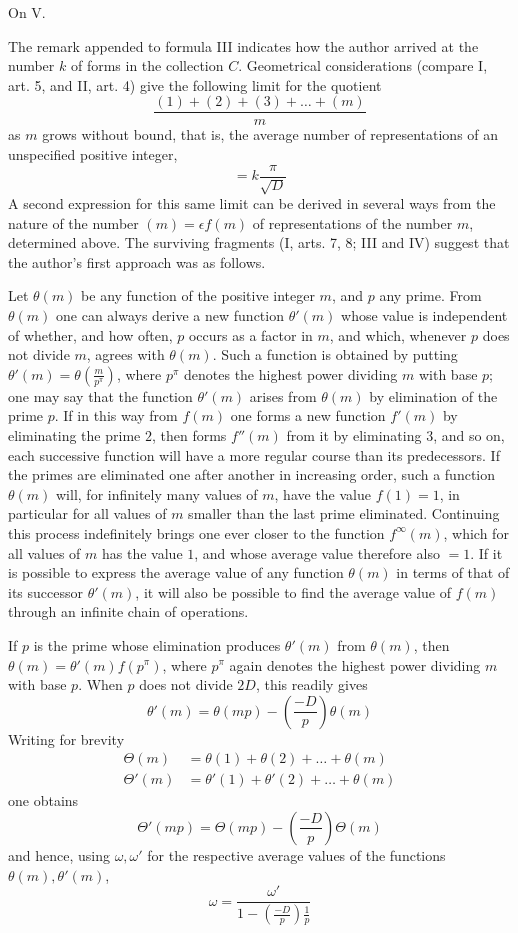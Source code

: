 \par\medskip{}\centerline{On V.}\smallskip
The remark appended to formula III indicates how the author arrived at the number $k$ of forms in the collection $C$. Geometrical considerations (compare I, art. 5, and II, art. 4) give the following limit for the quotient
\[
\frac{(1)+(2)+(3)+\ldots+(m)}m
\]
as $m$ grows without bound, that is, the average number of representations of an unspecified positive integer,
\[
=k\frac\pi{\surd D}
\]
A second expression for this same limit can be derived in several ways from the nature of the number $(m)=\epsilon f(m)$ of representations of the number $m$, determined above. The surviving fragments (I, arts. 7, 8; III and IV) suggest that the author's first approach was as follows.

Let $\theta(m)$ be any function of the positive integer $m$, and $p$ any prime. From $\theta(m)$ one can always derive a new function $\theta'(m)$ whose value is independent of whether, and how often, $p$ occurs as a factor in $m$, and which, whenever $p$ does not divide $m$, agrees with $\theta(m)$. Such a function is obtained by putting $\theta'(m)=\theta\left(\frac m{p^\pi}\right)$, where $p^\pi$ denotes the highest power dividing $m$ with base $p$; one may say that the function $\theta'(m)$ arises from $\theta(m)$ by elimination of the prime $p$. If in this way from $f(m)$ one forms a new function $f'(m)$ by eliminating the prime $2$, then forms $f''(m)$ from it by eliminating $3$, and so on, each successive function will have a more regular course than its predecessors. If the primes are eliminated one after another in increasing order, such a function
$\theta(m)$ will, for infinitely many values of $m$, have the value $f(1)=1$, in particular for all values of $m$ smaller than the last prime eliminated. Continuing this process indefinitely brings one ever closer to the function $f^\infty(m)$, which for all values of $m$ has the value $1$, and whose average value therefore also $=1$. If it is possible to express the average value of any function $\theta(m)$ in terms of that of its successor $\theta'(m)$, it will also be possible to find the average value of $f(m)$ through an infinite chain of operations.

If $p$ is the prime whose elimination produces $\theta'(m)$ from $\theta(m)$, then $\theta(m)=\theta'(m)f(p^\pi)$, where $p^\pi$ again denotes the highest power dividing $m$ with base $p$. When $p$ does not divide $2D$, this readily gives
\[
\theta'(m)=\theta(mp)-\left(\frac{-D}p\right)\theta(m)
\]
Writing for brevity
\[
\begin{aligned}
\Theta(m)&=\theta(1)+\theta(2)+\ldots+\theta(m)\\
\Theta'(m)&=\theta'(1)+\theta'(2)+\ldots+\theta(m)
\end{aligned}
\]
one obtains
\[
\Theta'(mp)=\Theta(mp)-\left(\frac{-D}p\right)\Theta(m)
\]
and hence, using $\omega,\omega'$ for the respective average values of the functions $\theta(m),\theta'(m)$,
\[
\omega=\frac{\omega'}{1-\left(\frac{-D}p\right)\frac1p}
\]

